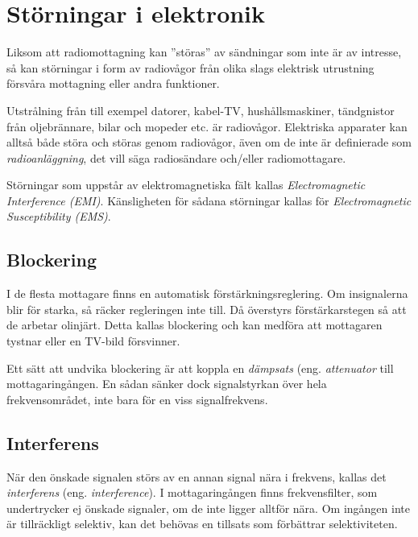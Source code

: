 \section{Störningar i elektronik}

Liksom att radiomottagning kan ''störas'' av sändningar som inte är av
intresse, så kan störningar i form av radiovågor från olika slags
elektrisk utrustning försvåra mottagning eller andra funktioner.

Utstrålning från till exempel datorer, kabel-TV, hushållsmaskiner,
tändgnistor från oljebrännare, bilar och mopeder etc. är radiovågor.
Elektriska apparater kan alltså både störa och störas genom
radiovågor, även om de inte är definierade som \emph{radioanläggning},
det vill säga radiosändare och/eller radiomottagare.

Störningar som uppstår av elektromagnetiska fält kallas
\emph{Electromagnetic Interference (EMI)}.
Känsligheten för sådana störningar kallas för
\emph{Electromagnetic Susceptibility (EMS)}.

\subsection{Blockering}
\label{blockering}

I de flesta mottagare finns en automatisk förstärkningsreglering.
Om insignalerna blir för starka, så räcker regleringen inte till.
Då överstyrs förstärkarstegen så att de arbetar olinjärt.
Detta kallas blockering och kan medföra att mottagaren tystnar eller en TV-bild
försvinner.

Ett sätt att undvika blockering är att koppla en \emph{dämpsats}
(eng. \emph{attenuator} till mottagaringången.
En sådan sänker dock signalstyrkan över hela frekvensområdet, inte bara för en
viss signalfrekvens.

\subsection{Interferens}

När den önskade signalen störs av en annan signal nära i frekvens, kallas det
\emph{interferens} (eng. \emph{interference}).
I mottagaringången finns frekvensfilter, som undertrycker ej önskade signaler,
om de inte ligger alltför nära.
Om ingången inte är tillräckligt selektiv, kan det behövas en tillsats som
förbättrar selektiviteten.

